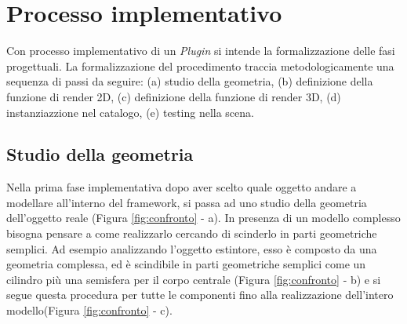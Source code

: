 \section{Processo implementativo}
\label{sec:chapter_3_section_5}

Con processo implementativo di un \emph{Plugin} si intende la formalizzazione delle fasi progettuali.
La formalizzazione del procedimento traccia metodologicamente una sequenza di passi da seguire:
(a) studio della geometria, (b) definizione della funzione di render 2D, (c) definizione della funzione di render 3D,
 (d) instanziazzione nel catalogo, (e) testing nella scena.


\subsection{Studio della geometria}
Nella prima fase implementativa dopo aver scelto quale oggetto andare a modellare all'interno del framework,
si passa ad uno studio della geometria dell'oggetto reale (Figura \ref{fig:confronto} - a).
In presenza di un modello complesso bisogna pensare a come realizzarlo cercando di scinderlo in parti geometriche semplici.
Ad esempio analizzando l'oggetto estintore, esso è composto da una geometria complessa, ed è scindibile in parti geometriche
semplici come un cilindro più una semisfera per il corpo centrale (Figura \ref{fig:confronto} - b) e si segue questa procedura
per tutte le componenti fino alla realizzazione dell'intero modello(Figura \ref{fig:confronto} - c).\\

